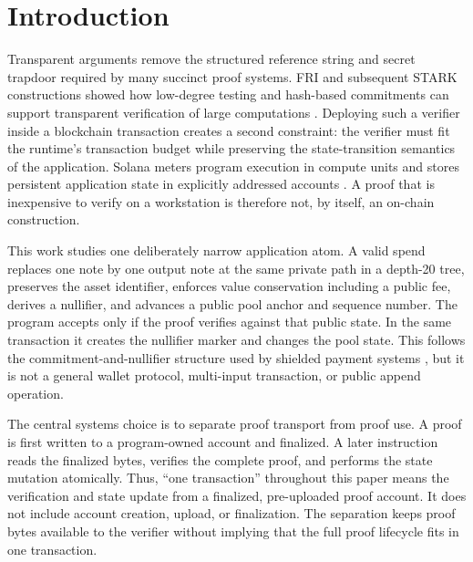 \section{Introduction}\label{sec:introduction}

Transparent arguments remove the structured reference string and secret
trapdoor required by many succinct proof systems.  FRI and subsequent STARK
constructions showed how low-degree testing and hash-based commitments can
support transparent verification of large computations
\cite{BenSassonBentovHoreshRiabzev2018FRI,
BenSassonBentovHoreshRiabzev2018STARK}.  Deploying such a verifier inside a
blockchain transaction creates a second constraint: the verifier must fit the
runtime's transaction budget while preserving the state-transition semantics
of the application.  Solana meters program execution in compute units and
stores persistent application state in explicitly addressed accounts
\cite{SolanaComputeBudget,SolanaAccounts}.  A proof that is inexpensive to verify
on a workstation is therefore not, by itself, an on-chain construction.

This work studies one deliberately narrow application atom.  A valid spend
replaces one note by one output note at the same private path in a depth-20
tree, preserves the asset identifier, enforces value conservation including a
public fee, derives a nullifier, and advances a public pool anchor and sequence
number.  The program accepts only if the proof verifies against that public
state.  In the same transaction it creates the nullifier marker and changes
the pool state.  This follows the commitment-and-nullifier structure used by
shielded payment systems \cite{BenSassonEtAl2014Zerocash}, but it is not a general
wallet protocol, multi-input transaction, or public append operation.

The central systems choice is to separate proof transport from proof use.  A
proof is first written to a program-owned account and finalized.  A later
instruction reads the finalized bytes, verifies the complete proof, and
performs the state mutation atomically.  Thus, ``one transaction'' throughout
this paper means the verification and state update from a finalized,
pre-uploaded proof account.  It does not include account creation, upload, or
finalization.  The separation keeps proof bytes available to the verifier
without implying that the full proof lifecycle fits in one transaction.


